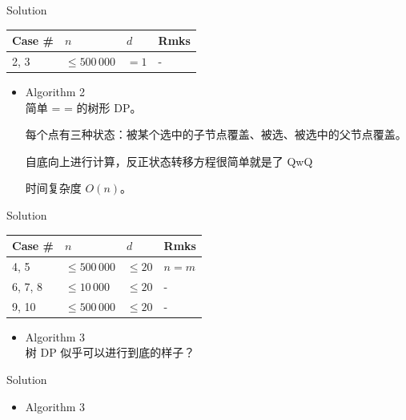 \documentclass[UTF8]{beamer}
\begin{document}
\begin{frame}{Solution}

\begin{tabularx}{\textwidth}{X|X|X|X} \hline
Case \# & $n$ & $d$ & Rmks \\ \hline \hline
2, 3    & $\leq 500\,000$ & $= 1$     & - \\ \hline
\end{tabularx}
\begin{itemize}
    \item Algorithm 2 \\
        简单 = = 的树形 DP。

        每个点有三种状态：被某个选中的子节点覆盖、被选、被选中的父节点覆盖。

        自底向上进行计算，反正状态转移方程很简单就是了 QwQ

        时间复杂度 $O(n)$。
\end{itemize}

\end{frame}

\begin{frame}{Solution}

\begin{tabularx}{\textwidth}{X|X|X|X} \hline
Case \# & $n$ & $d$ & Rmks \\ \hline \hline
4, 5    & $\leq 500\,000$ & $\leq 20$ & $n = m$ \\ \hline
6, 7, 8 & $\leq 10\,000$  & $\leq 20$ & - \\ \hline
9, 10   & $\leq 500\,000$ & $\leq 20$ & - \\ \hline
\end{tabularx}
\begin{itemize}
    \item Algorithm 3 \\
        树 DP 似乎可以进行到底的样子？
\end{itemize}

\end{frame}

\begin{frame}{Solution}

\begin{itemize}
    \item Algorithm 3 \\
        [TODO: Image]
\end{itemize}

\end{frame}
\end{document}
